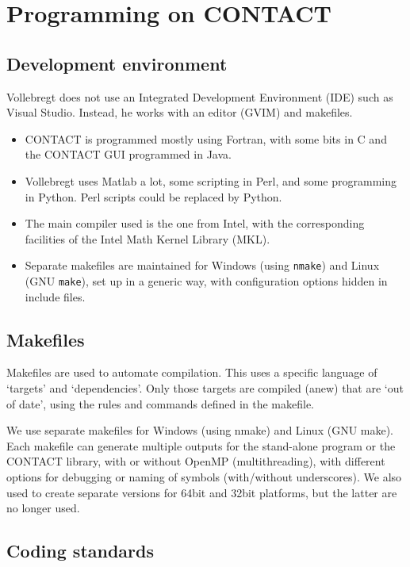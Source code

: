 \documentclass[12pt]{report}
\begin{document}
\chapter{Programming on CONTACT}

\section{Development environment}

Vollebregt does not use an Integrated Development Environment (IDE) such as
Visual Studio. Instead, he works with an editor (GVIM) and makefiles.
\begin{itemize}
\item CONTACT is programmed mostly using Fortran, with some bits in C and
        the CONTACT GUI programmed in Java.
\item Vollebregt uses Matlab a lot, some scripting in Perl, and some
        programming in Python. Perl scripts could be replaced by Python.
\item The main compiler used is the one from Intel, with the corresponding
        facilities of the Intel Math Kernel Library (MKL).
\item Separate makefiles are maintained for Windows (using {\tt nmake}) and
        Linux (GNU {\tt make}), set up in a generic way, with configuration
        options hidden in include files.
\end{itemize}

\section{Makefiles}

Makefiles are used to automate compilation. This uses a specific
language of `targets' and `dependencies'. Only those targets are
compiled (anew) that are `out of date', using the rules and commands
defined in the makefile.

We use separate makefiles for Windows (using nmake) and Linux (GNU make).
Each makefile can generate multiple outputs for the stand-alone program or
the CONTACT library, with or without OpenMP (multithreading), with
different options for debugging or naming of symbols (with/without
underscores). We also used to create separate versions for 64bit and 32bit
platforms, but the latter are no longer used.

\section{Coding standards}
\end{document}

